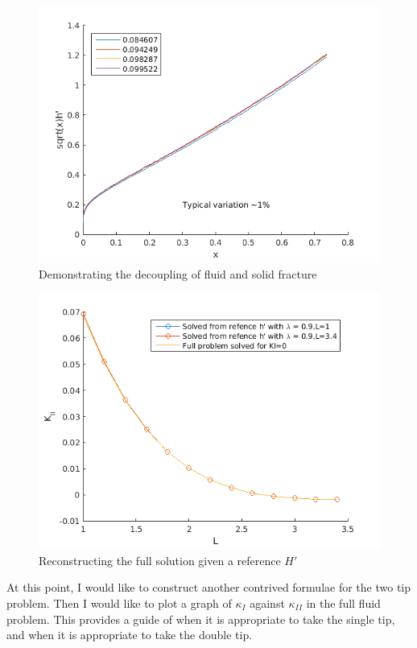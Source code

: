 \documentclass{jfm}
\begin{document}
\begin{figure}
 \centerline{
\includegraphics[scale=0.4]{./../../Graphs/hprime-variation.png}}
  \caption{Demonstrating the decoupling of fluid and solid fracture}
\end{figure}
%
\begin{figure}
 \centerline{
\includegraphics[scale=0.4]{./../../Graphs/fixed-fluid.png}}
  \caption{Reconstructing the full solution given a reference $H'$}
\end{figure}
At this point, I would like to construct another contrived formulae for the
two tip problem. Then I would like to plot a graph of $\kappa_I$ against
$\kappa_{II}$ in the full fluid problem. This provides a guide of when it
is appropriate to take the single tip, and when it is appropriate to take
the double tip. 
\end{document}

